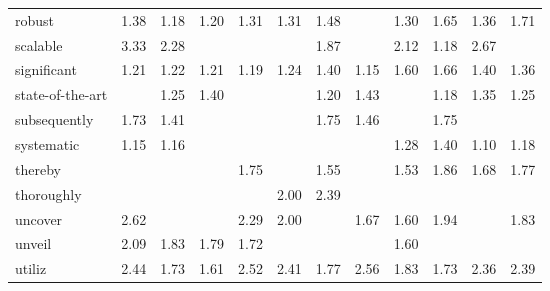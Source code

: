 \begin{tabular}{lrrrrrrrrrrr}
robust & \cellcolor{blue!27} 1.38 & \cellcolor{blue!23} 1.18 & \cellcolor{blue!24} 1.20 & \cellcolor{blue!26} 1.31 & \cellcolor{blue!26} 1.31 & \cellcolor{blue!29} 1.48 &  & \cellcolor{blue!26} 1.30 & \cellcolor{blue!32} 1.65 & \cellcolor{blue!27} 1.36 & \cellcolor{blue!34} 1.71 \\
scalable & \cellcolor{blue!66} 3.33 & \cellcolor{blue!45} 2.28 &  &  &  & \cellcolor{blue!37} 1.87 &  & \cellcolor{blue!42} 2.12 & \cellcolor{blue!23} 1.18 & \cellcolor{blue!53} 2.67 &  \\
significant & \cellcolor{blue!24} 1.21 & \cellcolor{blue!24} 1.22 & \cellcolor{blue!24} 1.21 & \cellcolor{blue!23} 1.19 & \cellcolor{blue!24} 1.24 & \cellcolor{blue!27} 1.40 & \cellcolor{blue!23} 1.15 & \cellcolor{blue!32} 1.60 & \cellcolor{blue!33} 1.66 & \cellcolor{blue!27} 1.40 & \cellcolor{blue!27} 1.36 \\
state-of-the-art &  & \cellcolor{blue!25} 1.25 & \cellcolor{blue!27} 1.40 &  &  & \cellcolor{blue!24} 1.20 & \cellcolor{blue!28} 1.43 &  & \cellcolor{blue!23} 1.18 & \cellcolor{blue!27} 1.35 & \cellcolor{blue!25} 1.25 \\
subsequently & \cellcolor{blue!34} 1.73 & \cellcolor{blue!28} 1.41 &  &  &  & \cellcolor{blue!35} 1.75 & \cellcolor{blue!29} 1.46 &  & \cellcolor{blue!35} 1.75 &  &  \\
systematic & \cellcolor{blue!23} 1.15 & \cellcolor{blue!23} 1.16 &  &  &  &  &  & \cellcolor{blue!25} 1.28 & \cellcolor{blue!27} 1.40 & \cellcolor{blue!22} 1.10 & \cellcolor{blue!23} 1.18 \\
thereby &  &  &  & \cellcolor{blue!35} 1.75 &  & \cellcolor{blue!31} 1.55 &  & \cellcolor{blue!30} 1.53 & \cellcolor{blue!37} 1.86 & \cellcolor{blue!33} 1.68 & \cellcolor{blue!35} 1.77 \\
thoroughly &  &  &  &  & \cellcolor{blue!40} 2.00 & \cellcolor{blue!47} 2.39 &  &  &  &  &  \\
uncover & \cellcolor{blue!52} 2.62 &  &  & \cellcolor{blue!45} 2.29 & \cellcolor{blue!40} 2.00 &  & \cellcolor{blue!33} 1.67 & \cellcolor{blue!32} 1.60 & \cellcolor{blue!38} 1.94 &  & \cellcolor{blue!36} 1.83 \\
unveil & \cellcolor{blue!41} 2.09 & \cellcolor{blue!36} 1.83 & \cellcolor{blue!35} 1.79 & \cellcolor{blue!34} 1.72 &  &  &  & \cellcolor{blue!32} 1.60 &  &  &  \\
utiliz & \cellcolor{blue!48} 2.44 & \cellcolor{blue!34} 1.73 & \cellcolor{blue!32} 1.61 & \cellcolor{blue!50} 2.52 & \cellcolor{blue!48} 2.41 & \cellcolor{blue!35} 1.77 & \cellcolor{blue!51} 2.56 & \cellcolor{blue!36} 1.83 & \cellcolor{blue!34} 1.73 & \cellcolor{blue!47} 2.36 & \cellcolor{blue!47} 2.39 \\

\end{tabular}
